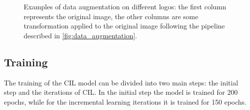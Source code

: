 \begin{figure}[H]
	\centering
	\hfill
	\hfill
	\hfill
	\hfill
	\hfill
	\caption{Examples of data augmentation on different logos: the first column represents the original image, the other columns are some transformation applied to the original image following the pipeline described in \autoref{fig:data_augmentation}.}%
	\label{fig:final_data_augmentation}%
\end{figure}

\subsection{Training}
The training of the CIL model can be divided into two main steps: the initial step and the iterations of CIL. In the initial step the model is trained for 200 epochs, while for the incremental learning iterations it is trained for 150 epochs.


